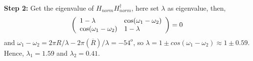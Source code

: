 \textbf{Step 2:} Get the eigenvalue of $H_{norm}H_{norm}^\dagger$, here set $\lambda$ as
eigenvalue, then,
\begin{equation}
\left( {{\begin{array}{*{20}c}
 {1 - \lambda } \hfill & {\cos (\omega _1 - \omega _2 )} \hfill \\
 {\cos (\omega _1 - \omega _2 )} \hfill & {1 - \lambda } \hfill \\
\end{array} }} \right) = 0
\end{equation}
and $\omega_1-\omega_2=2{\pi}R/\lambda-2{\pi}(\overline{R})/\lambda=-54^o$, so
$\lambda=1{\pm}cos(\omega_1-\omega_2){\approx}1{\pm}0.59$. Hence, $\lambda_1=1.59$ and
$\lambda_2=0.41$.




